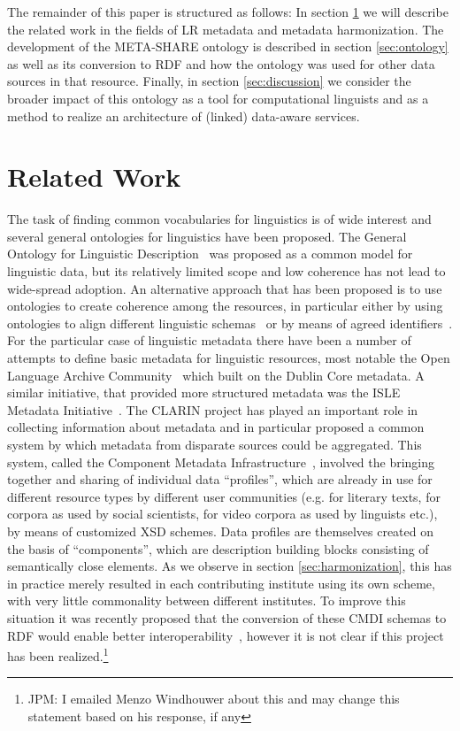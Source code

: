 \documentclass{llncs}
\begin{document}
The remainder of this paper is structured as follows: In section
\ref{sec:relatedwork} we will describe the related work in the fields of
LR metadata and metadata harmonization. The development of the
META-SHARE ontology is described in section \ref{sec:ontology}
as well as its conversion to RDF and how the ontology was used for other data sources in that
resource. Finally, in section \ref{sec:discussion} we consider the broader
impact of this ontology as a tool for computational linguists and as a method to
realize an architecture of (linked) data-aware services.

\section{Related Work}

\label{sec:relatedwork}

The task of finding common vocabularies for linguistics is of wide interest and
several general ontologies for linguistics have been proposed. The General
Ontology for Linguistic Description~\cite[GOLD]{farrar2002common} was proposed
as a common model for linguistic data, but its relatively limited scope and low
coherence has not lead to wide-spread adoption. An alternative approach that has
been proposed is to use ontologies to create coherence among the resources, in
particular either by using ontologies to align different linguistic
schemas~\cite{chiarcos2012ontologies} or by means of agreed
identifiers~\cite{kemps2008isocat}. For the particular case of linguistic
metadata there have been a number of attempts to define basic metadata for
linguistic resources, most notable the Open Language Archive
Community~\cite[OLAC]{bird2001olac} which built on the Dublin Core metadata. A
similar initiative, that provided more structured metadata was the ISLE Metadata
Initiative~\cite[IMDI]{broeder2001imdi}.
The CLARIN project has played an important role in collecting information about
metadata and in particular proposed a common system by which metadata from
disparate sources could be aggregated. This system, called the Component
Metadata Infrastructure~\cite{broeder2012cmdi}, involved the bringing together and sharing of
individual data ``profiles'', which are already in use for different resource
types by different user communities (e.g. for literary texts, for corpora as
used by social scientists, for video corpora as used by linguists etc.), by
means of customized XSD schemes. Data profiles are themselves created on the
basis of ``components'', which are description building blocks consisting of semantically close elements.
As we observe in section \ref{sec:harmonization}, this has in practice merely
resulted in each contributing institute using its own scheme, with very little
commonality between different institutes. To improve this situation it was
recently proposed that the conversion of these CMDI schemas to RDF would enable
better interoperability~\cite{durco2014clarin}, however it is not clear if this
project has been realized.\footnote{JPM: I emailed Menzo Windhouwer about this
and may change this statement based on his response, if any}
\end{document}
